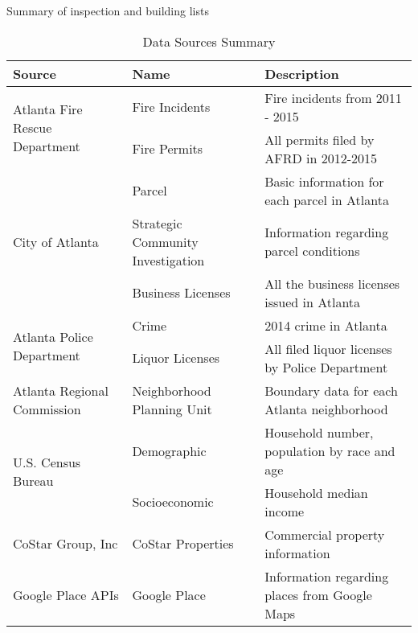 \documentclass{sig-alternate-05-2015}
\begin{document}
{\begin{table}[!h]
  \caption{Summary of inspection and building lists}
  \label{tab:inspections}\end{table}

\begin{table*}[htbp]
\small
\sffamily
  \centering
    \begin{tabular*}{0.9\textwidth}{lll}
    \toprule
    \textbf{Source} & \textbf{Name}  & \textbf{Description} \\
    \midrule
    \multicolumn{1}{l}{\multirow{2}[0]{*}{Atlanta Fire Rescue Department}} & \multicolumn{1}{l}{Fire Incidents} & \multicolumn{1}{l}{Fire incidents from 2011 - 2015} \\
\cmidrule{2-3}
    \multicolumn{1}{l}{} & \multicolumn{1}{l}{Fire Permits} & \multicolumn{1}{l}{All permits filed by AFRD in 2012-2015} \\
\midrule
    \multicolumn{1}{l}{\multirow{3}[0]{*}{City of Atlanta}} & \multicolumn{1}{l}{Parcel} & \multicolumn{1}{l}{Basic information for each parcel in Atlanta} \\
\cmidrule{2-3}
    \multicolumn{1}{l}{} & \multicolumn{1}{l}{Strategic Community Investigation} & \multicolumn{1}{l}{Information regarding parcel conditions} \\
\cmidrule{2-3}
    \multicolumn{1}{l}{} & \multicolumn{1}{l}{Business Licenses} & \multicolumn{1}{l}{All the business licenses issued in Atlanta} \\
\midrule
    \multicolumn{1}{l}{\multirow{2}[0]{*}{Atlanta Police Department}} & \multicolumn{1}{l}{Crime} & \multicolumn{1}{l}{2014 crime in Atlanta} \\
\cmidrule{2-3}
    \multicolumn{1}{l}{} & \multicolumn{1}{l}{Liquor Licenses} & \multicolumn{1}{l}{All filed liquor licenses by Police Department} \\
\midrule
    \multicolumn{1}{l}{Atlanta Regional Commission} & \multicolumn{1}{l}{Neighborhood Planning Unit} & \multicolumn{1}{l}{Boundary data for each Atlanta neighborhood} \\
\midrule
    \multicolumn{1}{l}{\multirow{2}[0]{*}{U.S. Census Bureau}} & \multicolumn{1}{l}{Demographic} & \multicolumn{1}{l}{Household number, population by race and age} \\
\cmidrule[0.01em]{2-3}
    \multicolumn{1}{l}{} & \multicolumn{1}{l}{Socioeconomic} & \multicolumn{1}{l}{Household median income} \\
\midrule
    \multicolumn{1}{l}{CoStar Group, Inc} & \multicolumn{1}{l}{CoStar Properties} & \multicolumn{1}{l}{Commercial property information} \\
\midrule
    \multicolumn{1}{l}{Google Place APIs} & \multicolumn{1}{l}{Google Place} & \multicolumn{1}{l}{Information regarding places from Google Maps} \\
    \bottomrule
    \end{tabular*}\caption{Data Sources Summary}
  \label{tab:datasummary}\end{table*}

}
\end{document}
